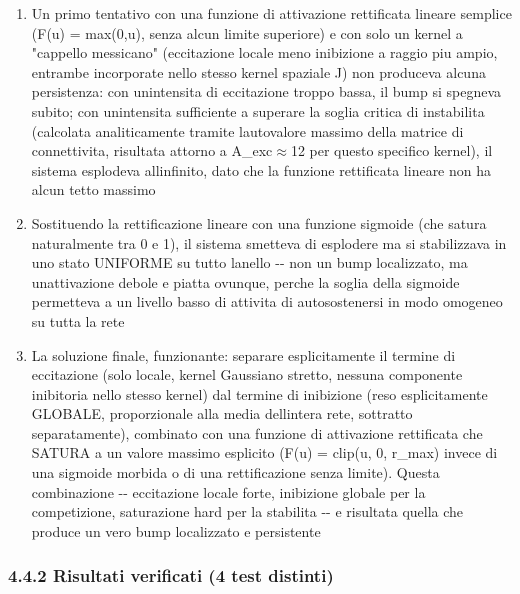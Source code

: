 \documentclass[
  italian,
]{article}
\begin{document}
\begin{enumerate}
\def\labelenumi{\arabic{enumi}.}
\item
  Un primo tentativo con una funzione di attivazione rettificata lineare semplice (F(u) = max(0,u), senza alcun limite superiore) e con solo un kernel a "cappello messicano" (eccitazione locale meno inibizione a raggio piu\textquotesingle{} ampio, entrambe incorporate nello stesso kernel spaziale J) non produceva alcuna persistenza: con un\textquotesingle intensita\textquotesingle{} di eccitazione troppo bassa, il bump si spegneva subito; con un\textquotesingle intensita\textquotesingle{} sufficiente a superare la soglia critica di instabilita\textquotesingle{} (calcolata analiticamente tramite l\textquotesingle autovalore massimo della matrice di connettivita\textquotesingle, risultata attorno a A\_\allowbreak{}exc$\approx$12 per questo specifico kernel), il sistema esplodeva all\textquotesingle infinito, dato che la funzione rettificata lineare non ha alcun tetto massimo
\item
  Sostituendo la rettificazione lineare con una funzione sigmoide (che satura naturalmente tra 0 e 1), il sistema smetteva di esplodere ma si stabilizzava in uno stato UNIFORME su tutto l\textquotesingle anello -\/- non un bump localizzato, ma un\textquotesingle attivazione debole e piatta ovunque, perche\textquotesingle{} la soglia della sigmoide permetteva a un livello basso di attivita\textquotesingle{} di autosostenersi in modo omogeneo su tutta la rete
\item
  La soluzione finale, funzionante: separare esplicitamente il termine di eccitazione (solo locale, kernel Gaussiano stretto, nessuna componente inibitoria nello stesso kernel) dal termine di inibizione (reso esplicitamente GLOBALE, proporzionale alla media dell\textquotesingle intera rete, sottratto separatamente), combinato con una funzione di attivazione rettificata che SATURA a un valore massimo esplicito (F(u) = clip(u, 0, r\_\allowbreak{}max) invece di una sigmoide morbida o di una rettificazione senza limite). Questa combinazione -\/- eccitazione locale forte, inibizione globale per la competizione, saturazione hard per la stabilita\textquotesingle{} -\/- e\textquotesingle{} risultata quella che produce un vero bump localizzato e persistente
\end{enumerate}

\subsubsection{4.4.2 Risultati verificati (4 test distinti)}\label{risultati-verificati-4-test-distinti}
\end{document}
